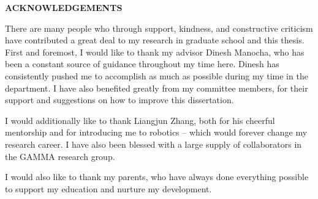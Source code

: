 \begin{center}
\vspace*{52pt}
{\Large \textbf{ACKNOWLEDGEMENTS}}
\end{center}

There are many people who through support, kindness, and constructive criticism have contributed a great deal to my research in graduate school and this thesis. First and foremost, I would like to thank my advisor Dinesh Manocha, who has been a constant source of guidance throughout my time here.  Dinesh has consistently pushed me to accomplish as much as possible during my time in the department. I have also benefited greatly from my committee members, for their support and suggestions on how to improve this dissertation.

I would additionally like to thank Liangjun Zhang, both for his cheerful mentorship and for introducing me to robotics -- which would forever change my research career.  I have also been blessed with a large supply of collaborators in the GAMMA research group.

I would also like to thank my parents, who have always done everything possible to support my education and nurture my development.

